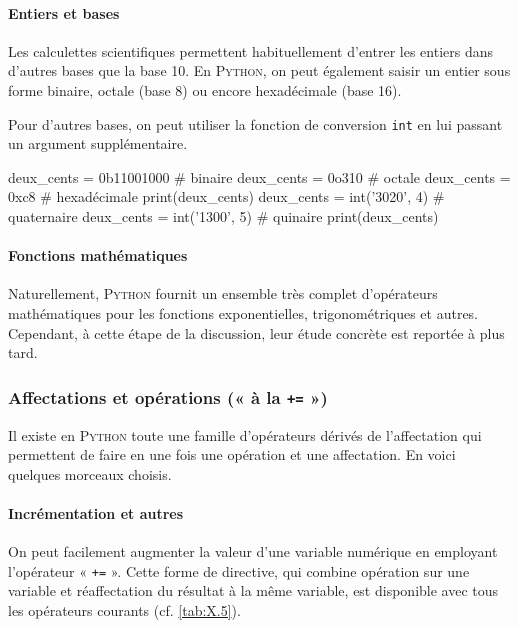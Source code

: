 \vspace{1pt}

\paragraph{Entiers et bases} Les calculettes scientifiques permettent habituellement d'entrer les entiers dans d'autres bases que la base 10. En \textsc{Python}, on peut également saisir un entier sous forme binaire, octale (base 8) ou encore hexadécimale (base 16).

Pour d'autres bases, on peut utiliser la fonction de conversion \texttt{int} en lui passant un argument supplémentaire.

\begin{idleconsole}
	\begin{pyconsole}
		deux_cents = 0b11001000     # binaire
		deux_cents = 0o310          # octale
		deux_cents = 0xc8           # hexadécimale
		print(deux_cents)
		deux_cents = int('3020', 4) # quaternaire
		deux_cents = int('1300', 5) # quinaire
		print(deux_cents)
	\end{pyconsole}
\end{idleconsole}

\vspace{1pt}

\paragraph{Fonctions mathématiques} Naturellement, \textsc{Python} fournit un ensemble très complet d'opérateurs mathématiques pour les fonctions exponentielles, trigonométriques et autres. Cependant, à cette étape de la discussion, leur étude concrète est reportée à plus tard.

\subsubsection[Affectations et opérations]{Affectations et opérations (« à la \texttt{+=} »)}
\label{subsub:X.3.1.3}

Il existe en \textsc{Python} toute une famille d'opérateurs dérivés de l'affectation qui permettent de faire en une fois une opération et une affectation. En voici quelques morceaux choisis.

\paragraph{Incrémentation et autres} On peut facilement augmenter la valeur d'une variable numérique en employant \nopagebreak l'opérateur « \texttt{+=} ». 
Cette forme de directive, qui combine opération sur une variable et réaffectation du résultat à la même variable, est disponible avec tous les opérateurs courants (cf. \cref{tab:X.5}).


